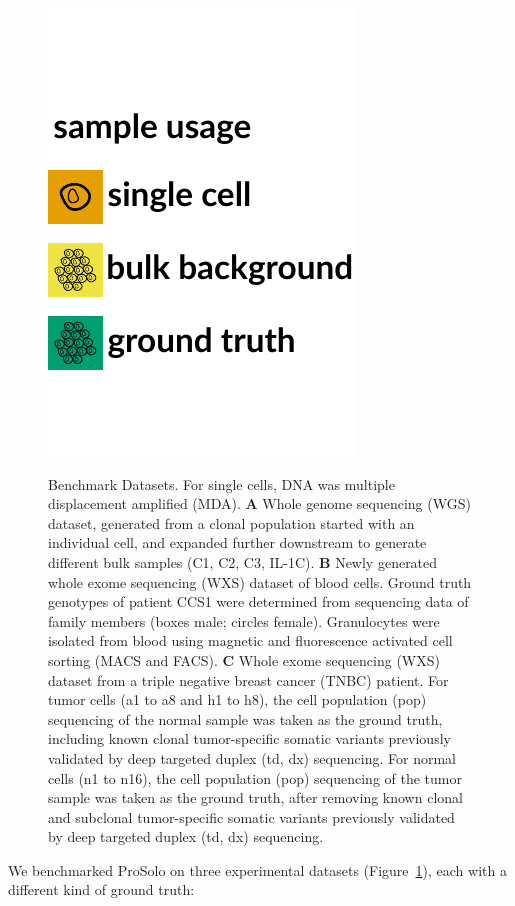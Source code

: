 \documentclass[12pt,inline]{wlscirep}
\begin{document}
\begin{figure}[!tpb]
\begin{minipage}{.5\linewidth}
  \end{minipage}
  \hspace{6ex}
  \begin{minipage}{.3\linewidth}
    \includegraphics[height=38ex]{figs/data_overview_color_legend.pdf} \\
  \end{minipage}
  \caption{
   Benchmark Datasets.
   For single cells, DNA was multiple displacement amplified (MDA).
   \textbf{A} Whole genome sequencing (WGS) dataset, generated from a clonal population started with an individual cell\cite{dong_accurate_2017}, and expanded further downstream to generate different bulk samples (C1, C2, C3, IL-1C).
   \textbf{B} Newly generated whole exome sequencing (WXS) dataset of blood cells.
   Ground truth genotypes of patient CCS1 were determined from sequencing data of family members (boxes male; circles female).
   Granulocytes were isolated from blood using magnetic and fluorescence activated cell sorting (MACS and FACS).
   \textbf{C} Whole exome sequencing (WXS) dataset from a triple negative breast cancer (TNBC) patient\cite{wang_clonal_2014}.
   For tumor cells (a1 to a8 and h1 to h8), the cell population (pop) sequencing of the normal sample was taken as the ground truth, including known clonal tumor-specific somatic variants previously validated by deep targeted duplex (td, dx) sequencing\cite{wang_clonal_2014}.
   For normal cells (n1 to n16), the cell population (pop) sequencing of the tumor sample was taken as the ground truth, after removing known clonal and subclonal tumor-specific somatic variants previously validated by deep targeted duplex (td, dx) sequencing\cite{wang_clonal_2014}.
   }
  \label{fig:datasets}
\end{figure}

We benchmarked ProSolo on three experimental datasets (Figure~\ref{fig:datasets}), each with a different kind of ground truth:\\
\end{document}
